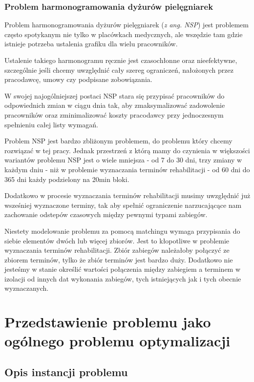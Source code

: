 \subsection{Problem harmonogramowania dyżurów pielęgniarek}
Problem harmonogramowania dyżurów pielęgniarek\cite{nurseScheduling} (\emph{z ang. NSP}) jest problemem często spotykanym nie tylko w placówkach medycznych, ale
wszędzie tam gdzie istnieje potrzeba ustalenia grafiku dla wielu pracowników.

Ustalenie takiego harmonogramu ręcznie jest czasochłonne oraz nieefektywne,
szczególnie jeśli chcemy uwzględnić cały szereg ograniczeń, nałożonych przez
pracodawcę, umowy czy podpisane zobowiązania.

W swojej najogólniejszej postaci NSP stara się przypisać pracowników do
odpowiednich zmian w ciągu dnia tak, aby zmaksymalizować zadowolenie pracowników
oraz zminimalizować koszty pracodawcy przy jednoczesnym spełnieniu całej listy
wymagań.

Problem NSP jest bardzo zbliżonym problemem, do problemu który chcemy rozwiązać
w tej pracy. Jednak przestrzeń z którą mamy do czynienia w większości wariantów problemu NSP jest o wiele mniejsza - od 7 do 30 dni, trzy zmiany w każdym dniu - niż w problemie wyznaczania terminów rehabilitacji - od 60 dni do 365 dni każdy podzielony na 20min bloki.

Dodatkowo w procesie wyznaczania terminów rehabilitacji musimy uwzględnić już wsześniej wyznaczone terminy, tak aby spełnić ograniczenie narzucającące nam zachowanie odstepów czasowych między pewnymi typami zabiegów.

Niestety modelowanie problemu za pomocą matchingu wymaga przypisania do
siebie elementów dwóch lub więcej zbiorów. Jest to kłopotliwe w problemie wyznaczania
terminów rehabilitacji. Zbiór zabiegów należałoby połączyć ze zbiorem
terminów, tylko że zbiór terminów jest bardzo duży. Dodatkowo nie jesteśmy w
stanie określić wartości połączenia między zabiegiem a terminem w
izolacji od innych dat wykonania zabiegów, tych istniejących jak i tych
obecnie wyznaczanych.

\chapter{Przedstawienie problemu jako ogólnego problemu optymalizacji}
\section{Opis instancji problemu}
